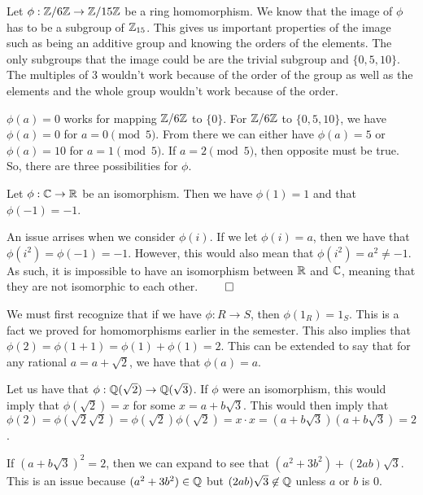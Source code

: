 \documentclass[12pt]{report}
\begin{document}
\sol Let $\phi : \ZZ/6\ZZ \to \ZZ / 15\ZZ$ be a ring homomorphism. We know that the image of $\phi$ has to be a subgroup of $\ZZ_{15}$. This gives us important properties of the image such as being an additive group and knowing the orders of the elements. The only subgroups that the image could be are the trivial subgroup and $\{0, 5, 10\}$. The multiples of 3 wouldn't work because of the order of the group as well as the elements and the whole group wouldn't work because of the order. 

$\phi(a) = 0$ works for mapping $\ZZ/6\ZZ$ to $\{0\}$. For $\ZZ/6\ZZ$ to $\{0, 5, 10\}$, we have $\phi(a) = 0$ for $a = 0 \pmod{5}$. From there we can either have $\phi(a) = 5$ or $\phi(a) = 10$ for $a = 1 \pmod{5}$. If $a = 2 \pmod{5}$, then opposite must be true. So, there are three possibilities for $\phi$.



\sol Let $\phi : \CC \to \RR$ be an isomorphism. Then we have $\phi(1) = 1$ and that $\phi(-1) = -1$. 

An issue arrises when we consider $\phi(i)$. If we let $\phi(i) = a$, then we have that $\phi(i^2) = \phi(-1) = -1$. However, this would also mean that $\phi(i^2) = a^2 \neq -1$. As such, it is impossible to have an isomorphism between $\RR$ and $\CC$, meaning that they are not isomorphic to each other. $\qed$


\sol We must first recognize that if we have $\phi : R \to S$, then $\phi(1_R) = 1_S$. This is a fact we proved for homomorphisms earlier in the semester. This also implies that $\phi(2) = \phi(1+1) = \phi(1) + \phi(1) = 2$. This can be extended to say that for any rational $a = a + \sqrt{2}$, we have that $\phi(a) = a$. 

Let us have that $\phi : \QQ(\sqrt{2}) \to \QQ(\sqrt{3})$. If $\phi$ were an isomorphism, this would imply that $\phi(\sqrt{2}) = x$ for some $x = a+b\sqrt{3}$. This would then imply that $\phi(2) = \phi(\sqrt{2}\sqrt{2}) = \phi(\sqrt{2})\phi(\sqrt{2}) = x\cdot x = (a+b\sqrt{3})(a+b\sqrt{3}) = 2$. 

If $(a+b\sqrt{3})^2 = 2$, then we can expand to see that $(a^2+3b^2) + (2ab)\sqrt{3}$. This is an issue because $(a^2+3b^2) \in \QQ$ but $(2ab)\sqrt{3} \not\in \QQ$ unless $a$ or $b$ is 0. 
\end{document}

